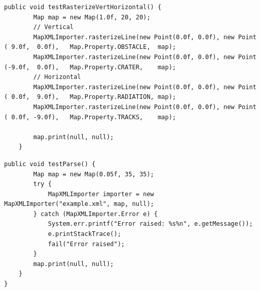\documentclass[12pt,a4paper]{article}
\begin{document}
     \begin{lstlisting}[caption=MapXMLImporter automated test suite 2, captionpos=b, label={lst:MapXMLImporterAutomatedTestSuite2}]
     public void testRasterizeVertHorizontal() {
        Map map = new Map(1.0f, 20, 20);
        // Vertical
        MapXMLImporter.rasterizeLine(new Point(0.0f, 0.0f), new Point ( 9.0f,  0.0f),   Map.Property.OBSTACLE,  map);
        MapXMLImporter.rasterizeLine(new Point(0.0f, 0.0f), new Point (-9.0f,  0.0f),   Map.Property.CRATER,    map);
        // Horizontal
        MapXMLImporter.rasterizeLine(new Point(0.0f, 0.0f), new Point ( 0.0f,  9.0f),   Map.Property.RADIATION, map);
        MapXMLImporter.rasterizeLine(new Point(0.0f, 0.0f), new Point ( 0.0f, -9.0f),   Map.Property.TRACKS,    map);
        
        map.print(null, null);
    }
     \end{lstlisting}
     
     \begin{lstlisting}[caption=MapXMLImporter automated test suite 3, captionpos=b, label={lst:MapXMLImporterAutomatedTestSuite3}]
     public void testParse() {
        Map map = new Map(0.05f, 35, 35);
        try {
            MapXMLImporter importer = new MapXMLImporter("example.xml", map, null);
        } catch (MapXMLImporter.Error e) {
            System.err.printf("Error raised: %s%n", e.getMessage());
            e.printStackTrace();
            fail("Error raised");
        }
        map.print(null, null);
    }
}
     \end{lstlisting}
     
\end{document}
